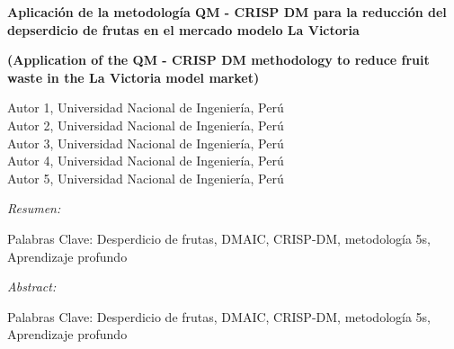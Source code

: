 \documentclass[11pt]{article}
\begin{document}
\begin{center}
    \begin{spacing}{1.2}
    \bf\fontsize{19}{21}\selectfont\color{azul} Aplicación de la metodología QM - CRISP DM para la reducción del depserdicio de frutas en el mercado modelo La Victoria
    \end{spacing}
\vspace{1mm}
    {\bf (Application of the QM - CRISP DM methodology to reduce fruit waste in the La Victoria model market)}
    
    
    \vspace{2.5mm}
    {\small Autor 1, Universidad Nacional de Ingeniería, Perú\\
Autor 2, Universidad Nacional de Ingeniería, Perú\\
Autor 3, Universidad Nacional de Ingeniería, Perú\\
Autor 4, Universidad Nacional de Ingeniería, Perú\\
Autor 5, Universidad Nacional de Ingeniería, Perú}
    
\end{center}

\begin{spacing}{0.95}
\footnotesize\noindent\itshape Resumen: \lipsum[1]
\vspace{-0.2cm}
\begin{center}
    Palabras Clave: Desperdicio de frutas, DMAIC, CRISP-DM, metodología 5s, Aprendizaje profundo
\end{center}
\end{spacing}

\begin{spacing}{0.95}
\footnotesize\noindent\itshape Abstract: \lipsum[1]
\vspace{-0.2cm}
\begin{center}
    Palabras Clave: Desperdicio de frutas, DMAIC, CRISP-DM, metodología 5s, Aprendizaje profundo
\end{center}
\end{spacing}
\tableofcontents
\thispagestyle{plain}






\end{document}
